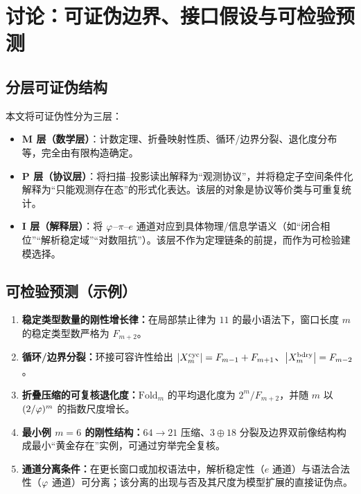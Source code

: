 \section{讨论：可证伪边界、接口假设与可检验预测}

\subsection{分层可证伪结构}

本文将可证伪性分为三层：
\begin{itemize}
  \item \textbf{M 层（数学层）}：计数定理、折叠映射性质、循环/边界分裂、退化度分布等，完全由有限构造确定。
  \item \textbf{P 层（协议层）}：将扫描--投影读出解释为“观测协议”，并将稳定子空间条件化解释为“只能观测存在态”的形式化表达。该层的对象是协议等价类与可重复统计。
  \item \textbf{I 层（解释层）}：将 $\varphi$--$\pi$--$e$ 通道对应到具体物理/信息学语义（如“闭合相位”“解析稳定域”“对数阻抗”）。该层不作为定理链条的前提，而作为可检验建模选择。
\end{itemize}

\subsection{可检验预测（示例）}

\begin{enumerate}
  \item \textbf{稳定类型数量的刚性增长律：}在局部禁止律为 $11$ 的最小语法下，窗口长度 $m$ 的稳定类型数严格为 $F_{m+2}$。
  \item \textbf{循环/边界分裂：}环接可容许性给出 $\left\lvert X_m^{\mathrm{cyc}}\right\rvert=F_{m-1}+F_{m+1}$、$\left\lvert X_m^{\mathrm{bdry}}\right\rvert=F_{m-2}$。
  \item \textbf{折叠压缩的可复核退化度：}$\mathrm{Fold}_m$ 的平均退化度为 $2^m/F_{m+2}$，并随 $m$ 以 $(2/\varphi)^m$ 的指数尺度增长。
  \item \textbf{最小例 $m=6$ 的刚性结构：}$64\to 21$ 压缩、$3\oplus 18$ 分裂及边界双前像结构构成最小“黄金存在”实例，可通过穷举完全复核。
  \item \textbf{通道分离条件：}在更长窗口或加权语法中，解析稳定性（$e$ 通道）与语法合法性（$\varphi$ 通道）可分离；该分离的出现与否及其尺度为模型扩展的直接证伪点。
\end{enumerate}

